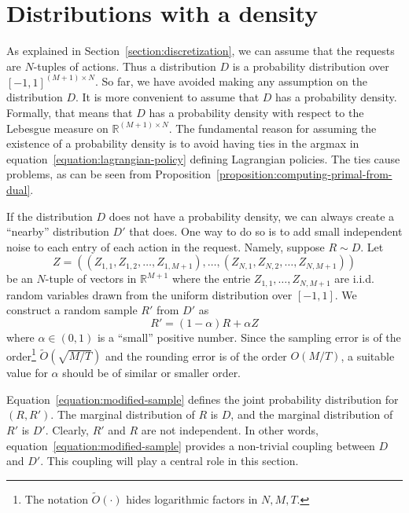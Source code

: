 \documentclass[12pt]{article}
\newcommand{\R}{\mathbb{R}}
\theoremstyle{definition}
\begin{document}
\section{Distributions with a density}

As explained in Section~\ref{section:discretization}, we can assume that the
requests are $N$-tuples of actions. Thus a distribution $D$ is a probability
distribution over $[-1,1]^{(M+1) \times N}$. So far, we have avoided making any
assumption on the distribution $D$. It is more convenient to assume that $D$ has
a probability density. Formally, that means that $D$ has a probability density
with respect to the Lebesgue measure on $\R^{(M+1) \times N}$. The fundamental
reason for assuming the existence of a probability density is to avoid having
ties in the argmax in equation~\eqref{equation:lagrangian-policy} defining
Lagrangian policies. The ties cause problems, as can be seen from
Proposition~\ref{proposition:computing-primal-from-dual}.

If the distribution $D$ does not have a probability density, we can always
create a ``nearby'' distribution $D'$ that does. One way to do so is to add
small independent noise to each entry of each action in the request. Namely,
suppose $R \sim D$. Let
$$
Z = ((Z_{1,1}, Z_{1,2}, \dots, Z_{1,M+1}), \dots, (Z_{N,1}, Z_{N,2}, \dots, Z_{N,M+1}))
$$
be an $N$-tuple of vectors in $\R^{M+1}$ where the entrie $Z_{1,1}, \dots,
Z_{N,M+1}$ are i.i.d. random variables drawn from the uniform distribution over
$[-1,1]$. We construct a random sample $R'$ from $D'$ as
\begin{equation}
\label{equation:modified-sample}
R' = (1-\alpha)R + \alpha Z
\end{equation}
where $\alpha \in (0,1)$ is a ``small'' positive number. Since the sampling
error is of the order\footnote{The notation $\widetilde{O}(\cdot)$ hides
logarithmic factors in $N,M,T$.} $\widetilde{O}(\sqrt{M/T})$ and the rounding
error is of the order $O(M/T)$, a suitable value for $\alpha$ should be of
similar or smaller order.

Equation~\eqref{equation:modified-sample} defines the joint probability
distribution for $(R,R')$. The marginal distribution of $R$ is $D$, and the
marginal distribution of $R'$ is $D'$. Clearly, $R'$ and $R$ are not
independent. In other words, equation~\eqref{equation:modified-sample}
provides a non-trivial coupling between $D$ and $D'$. This coupling will play a
central role in this section.
\end{document}
